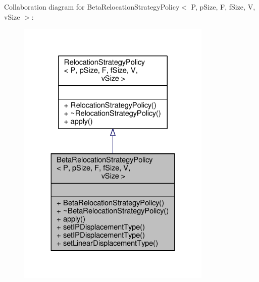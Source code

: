 Collaboration diagram for Beta\+Relocation\+Strategy\+Policy$<$ P, p\+Size, F, f\+Size, V, v\+Size $>$\+:
\nopagebreak
\begin{figure}[H]
\begin{center}
\leavevmode
\includegraphics[width=263pt]{classBetaRelocationStrategyPolicy__coll__graph}
\end{center}
\end{figure}
